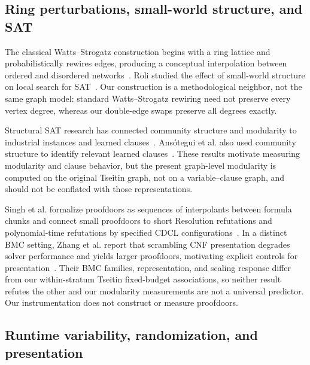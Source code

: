 \documentclass[11pt]{article}
\begin{document}
\subsection{Ring perturbations, small-world structure, and SAT}

The classical Watts--Strogatz construction begins with a ring lattice and probabilistically rewires edges, producing a conceptual interpolation between ordered and disordered networks~\cite{WattsStrogatz1998}. Roli studied the effect of small-world structure on local search for SAT~\cite{Roli2005}. Our construction is a methodological neighbor, not the same graph model: standard Watts--Strogatz rewiring need not preserve every vertex degree, whereas our double-edge swaps preserve all degrees exactly.

Structural SAT research has connected community structure and modularity to industrial instances and learned clauses~\cite{AnsoteguiEtAl2012,AnsoteguiEtAl2019}. Ansótegui et al. also used community structure to identify relevant learned clauses~\cite{AnsoteguiEtAl2015}. These results motivate measuring modularity and clause behavior, but the present graph-level modularity is computed on the original Tseitin graph, not on a variable--clause graph, and should not be conflated with those representations.

Singh et al. formalize proofdoors as sequences of interpolants between formula chunks and connect small proofdoors to short Resolution refutations and polynomial-time refutations by specified CDCL configurations~\cite{SinghEtAl2026}. In a distinct BMC setting, Zhang et al. report that scrambling CNF presentation degrades solver performance and yields larger proofdoors, motivating explicit controls for presentation~\cite{ZhangEtAl2026}. Their BMC families, representation, and scaling response differ from our within-stratum Tseitin fixed-budget associations, so neither result refutes the other and our modularity measurements are not a universal predictor. Our instrumentation does not construct or measure proofdoors.

\subsection{Runtime variability, randomization, and presentation}
\end{document}
